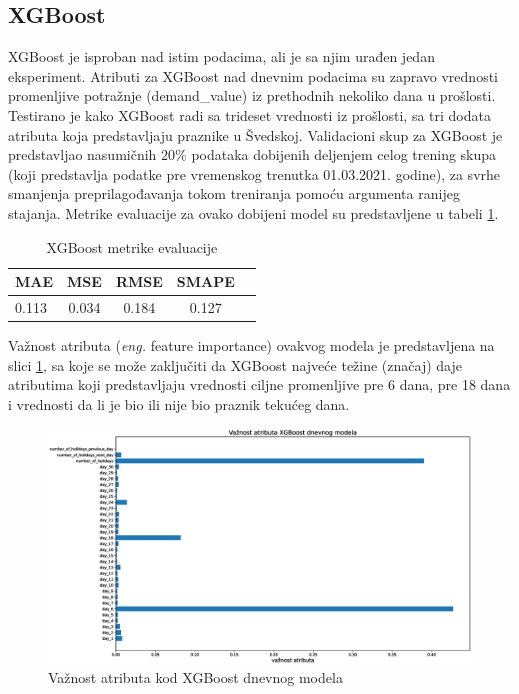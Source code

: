 \documentclass[12pt,oneside]{memoir}
\begin{document}
\subsection{XGBoost}
XGBoost je isproban nad istim podacima, ali je sa njim urađen jedan eksperiment. Atributi za XGBoost nad dnevnim podacima su zapravo vrednosti promenljive potražnje (demand\_value) iz prethodnih nekoliko dana u prošlosti. Testirano je kako XGBoost radi sa trideset vrednosti iz prošlosti, sa tri dodata atributa koja predstavljaju praznike u Švedskoj.
Validacioni skup za XGBoost je predstavljao nasumičnih $20\%$ podataka dobijenih deljenjem celog trening skupa (koji predstavlja podatke pre vremenskog trenutka 01.03.2021. godine), za svrhe smanjenja preprilagođavanja tokom treniranja pomoću argumenta ranijeg stajanja. Metrike evaluacije za ovako dobijeni model su predstavljene u tabeli \ref{tbl: xgboost_1}. 
\begin{table}
\centering
\caption{XGBoost metrike evaluacije}
\label{tbl: xgboost_1}
\begin{tabular}{ |l|c|c|c|c|} 
\hline
MAE & MSE & RMSE & SMAPE \\
\hline
0.113 & 0.034 & 0.184 & 0.127 \\ 
\hline
\end{tabular}
\end{table}
Važnost atributa (\textit{eng.} feature importance) ovakvog modela je predstavljena na slici \ref{fig: vaznost_atributa}, sa koje se može zaključiti da XGBoost najveće težine (značaj) daje atributima koji predstavljaju vrednosti ciljne promenljive pre 6 dana, pre 18 dana i vrednosti da li je bio ili nije bio praznik tekućeg dana.
\begin{figure}[!ht]
  \centering
  \includegraphics[width=1\textwidth]{./grafici/vaznost_atributa.eps}
  \caption{Važnost atributa kod XGBoost dnevnog modela}
  \label{fig: vaznost_atributa}
\end{figure}
\end{document}
